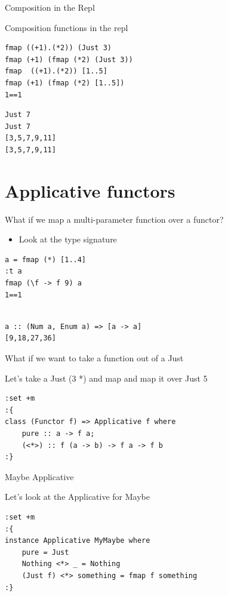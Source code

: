 \documentclass[presetation]{beamer}
\begin{document}
\begin{frame}[fragile,label={sec:orgc2d7beb}]{Composition in the Repl}
 \begin{block}{Composition functions in the repl}
\begin{verbatim}
fmap ((+1).(*2)) (Just 3)
fmap (+1) (fmap (*2) (Just 3))
fmap  ((+1).(*2)) [1..5]
fmap (+1) (fmap (*2) [1..5])
1==1
\end{verbatim}

\begin{verbatim}
Just 7
Just 7
[3,5,7,9,11]
[3,5,7,9,11]
\end{verbatim}
\end{block}
\end{frame}

\section{Applicative functors}
\label{sec:org105dd5f}
\begin{frame}[fragile,label={sec:org34194ee}]{What if we map a multi-parameter function over a functor?}
 \begin{itemize}
\item Look at the type signature
\end{itemize}
\begin{verbatim}
a = fmap (*) [1..4]
:t a
fmap (\f -> f 9) a
1==1
\end{verbatim}

\begin{verbatim}

a :: (Num a, Enum a) => [a -> a]
[9,18,27,36]
\end{verbatim}
\end{frame}

\begin{frame}[fragile,label={sec:org3bdac8f}]{What if we want to take a function out of a Just}
 \begin{block}{Let's take a Just (3 *) and map}
and map it over Just 5
\begin{verbatim}
:set +m
:{
class (Functor f) => Applicative f where
    pure :: a -> f a;
    (<*>) :: f (a -> b) -> f a -> f b
:}
\end{verbatim}
\end{block}
\end{frame}

\begin{frame}[fragile,label={sec:orgbb7db02}]{Maybe Applicative}
 \begin{block}{Let's look at the Applicative for Maybe}
\begin{verbatim}
:set +m
:{
instance Applicative MyMaybe where
    pure = Just
    Nothing <*> _ = Nothing
    (Just f) <*> something = fmap f something
:}
\end{verbatim}
\end{block}
\end{frame}
\end{document}
